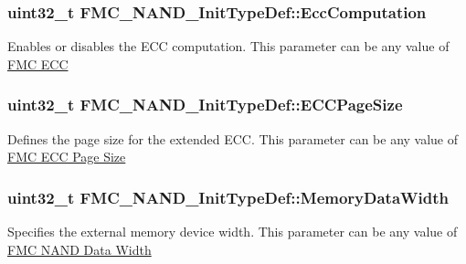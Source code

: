 \subsubsection[{\texorpdfstring{Ecc\+Computation}{EccComputation}}]{\setlength{\rightskip}{0pt plus 5cm}uint32\+\_\+t F\+M\+C\+\_\+\+N\+A\+N\+D\+\_\+\+Init\+Type\+Def\+::\+Ecc\+Computation}\hypertarget{struct_f_m_c___n_a_n_d___init_type_def_ad335b69985dfaba63645e4eedb12dceb}{}\label{struct_f_m_c___n_a_n_d___init_type_def_ad335b69985dfaba63645e4eedb12dceb}
Enables or disables the E\+CC computation. This parameter can be any value of \hyperlink{group___f_m_c___e_c_c}{F\+MC E\+CC} 
\subsubsection[{\texorpdfstring{E\+C\+C\+Page\+Size}{ECCPageSize}}]{\setlength{\rightskip}{0pt plus 5cm}uint32\+\_\+t F\+M\+C\+\_\+\+N\+A\+N\+D\+\_\+\+Init\+Type\+Def\+::\+E\+C\+C\+Page\+Size}\hypertarget{struct_f_m_c___n_a_n_d___init_type_def_ad1f82ad7a61b76489541c17868e7544b}{}\label{struct_f_m_c___n_a_n_d___init_type_def_ad1f82ad7a61b76489541c17868e7544b}
Defines the page size for the extended E\+CC. This parameter can be any value of \hyperlink{group___f_m_c___e_c_c___page___size}{F\+MC E\+CC Page Size} 
\subsubsection[{\texorpdfstring{Memory\+Data\+Width}{MemoryDataWidth}}]{\setlength{\rightskip}{0pt plus 5cm}uint32\+\_\+t F\+M\+C\+\_\+\+N\+A\+N\+D\+\_\+\+Init\+Type\+Def\+::\+Memory\+Data\+Width}\hypertarget{struct_f_m_c___n_a_n_d___init_type_def_afba56d09ca367a400126147a86ccda2e}{}\label{struct_f_m_c___n_a_n_d___init_type_def_afba56d09ca367a400126147a86ccda2e}
Specifies the external memory device width. This parameter can be any value of \hyperlink{group___f_m_c___n_a_n_d___data___width}{F\+MC N\+A\+ND Data Width} 

